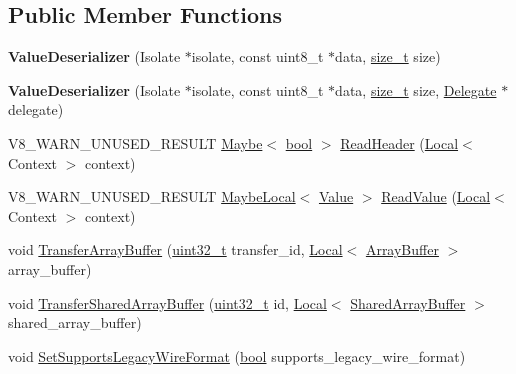 \subsection*{Public Member Functions}
\begin{DoxyCompactItemize}
\item 
\mbox{\label{classv8_1_1ValueDeserializer_a8ffab323ccaa68672041bb8cb2171187}} 
{\bfseries Value\+Deserializer} (Isolate $\ast$isolate, const uint8\+\_\+t $\ast$data, \mbox{\hyperlink{classsize__t}{size\+\_\+t}} size)
\item 
\mbox{\label{classv8_1_1ValueDeserializer_a122d1594dae10113a3a56a6f924d5c70}} 
{\bfseries Value\+Deserializer} (Isolate $\ast$isolate, const uint8\+\_\+t $\ast$data, \mbox{\hyperlink{classsize__t}{size\+\_\+t}} size, \mbox{\hyperlink{classv8_1_1ValueDeserializer_1_1Delegate}{Delegate}} $\ast$delegate)
\item 
V8\+\_\+\+W\+A\+R\+N\+\_\+\+U\+N\+U\+S\+E\+D\+\_\+\+R\+E\+S\+U\+LT \mbox{\hyperlink{classv8_1_1Maybe}{Maybe}}$<$ \mbox{\hyperlink{classbool}{bool}} $>$ \mbox{\hyperlink{classv8_1_1ValueDeserializer_a96d813a90d2de3fff2232f0a1e0f3b8b}{Read\+Header}} (\mbox{\hyperlink{classv8_1_1Local}{Local}}$<$ Context $>$ context)
\item 
V8\+\_\+\+W\+A\+R\+N\+\_\+\+U\+N\+U\+S\+E\+D\+\_\+\+R\+E\+S\+U\+LT \mbox{\hyperlink{classv8_1_1MaybeLocal}{Maybe\+Local}}$<$ \mbox{\hyperlink{classv8_1_1Value}{Value}} $>$ \mbox{\hyperlink{classv8_1_1ValueDeserializer_aa8b6efe5d8e47a2160b2b4e30ab3faa4}{Read\+Value}} (\mbox{\hyperlink{classv8_1_1Local}{Local}}$<$ Context $>$ context)
\item 
void \mbox{\hyperlink{classv8_1_1ValueDeserializer_a853acc2c7b30571d6719ddd92a48da3b}{Transfer\+Array\+Buffer}} (\mbox{\hyperlink{classuint32__t}{uint32\+\_\+t}} transfer\+\_\+id, \mbox{\hyperlink{classv8_1_1Local}{Local}}$<$ \mbox{\hyperlink{classv8_1_1ArrayBuffer}{Array\+Buffer}} $>$ array\+\_\+buffer)
\item 
void \mbox{\hyperlink{classv8_1_1ValueDeserializer_a3730fe24f81054d6f75a1b23f77a0e6c}{Transfer\+Shared\+Array\+Buffer}} (\mbox{\hyperlink{classuint32__t}{uint32\+\_\+t}} id, \mbox{\hyperlink{classv8_1_1Local}{Local}}$<$ \mbox{\hyperlink{classv8_1_1SharedArrayBuffer}{Shared\+Array\+Buffer}} $>$ shared\+\_\+array\+\_\+buffer)
\item 
void \mbox{\hyperlink{classv8_1_1ValueDeserializer_a076d92b67d68c64404f1065d0dcd85b6}{Set\+Supports\+Legacy\+Wire\+Format}} (\mbox{\hyperlink{classbool}{bool}} supports\+\_\+legacy\+\_\+wire\+\_\+format)

\end{DoxyCompactItemize}
